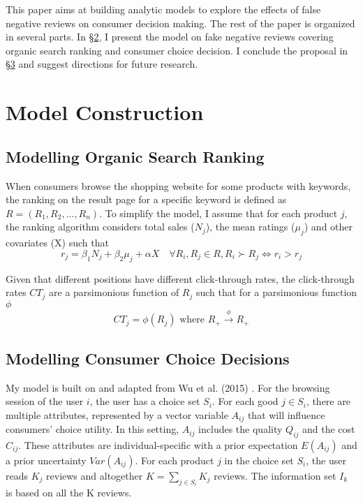 ﻿\documentclass[a4paper,10pt]{article}
\begin{document}
This paper aims at building analytic models to explore the effects of false negative reviews on consumer decision making. The rest of the paper is organized in several parts. In §\hyperref[model]{2}, I present the model on fake negative reviews covering organic search ranking and consumer choice decision. I conclude the proposal in §\hyperref[future]{3} and suggest directions for future research. 

\section{Model Construction} \label{model}

\subsection{Modelling Organic Search Ranking}

When consumers browse the shopping website for some products with keywords, the ranking on the result page for a specific keyword is defined as $R = (R_1, R_2, ..., R_n)$. To simplify the model, I assume that for each product $j$, the ranking algorithm considers total sales ($N_j$), the mean ratings ($\mu_j$) and other covariates (X) such that 
\begin{equation}
    r_j = \beta_1 N_j + \beta_2 \mu_j + \alpha X
    \quad \forall R_i, R_j \in R, R_i \succ R_j \Longleftrightarrow r_i > r_j
\end{equation}

Given that different positions have different click-through rates, the click-through rates $CT_j$ are a parsimonious function of $R_j$ such that for a parsimonious function $\phi$
\begin{equation}
    CT_j = \phi(R_j)
    \text{ where }
    R_{+}\xrightarrow{\phi}R_{+}
\end{equation}

\subsection{Modelling Consumer Choice Decisions}

My model is built on and adapted from Wu et al. (2015) \cite{Wu2015}.  
For the browsing session of the user $i$, the user has a choice set $S_{i}$. For each good $j \in S_{i}$, there are multiple attributes, represented by a vector variable $A_{ij}$ that will influence consumers' choice utility. In this setting, $A_{ij}$ includes the quality $Q_{ij}$ and the cost $C_{ij}$. These attributes are individual-specific with a prior expectation $E(A_{ij})$ and a prior uncertainty $Var(A_{ij})$. For each product $j$ in the choice set $S_{i}$, the user reads $K_j$ reviews and altogether $K = \sum_{j\in{S_i}} K_j$ reviews. The information set $I_k$ is based on all the K reviews.   
\end{document}
